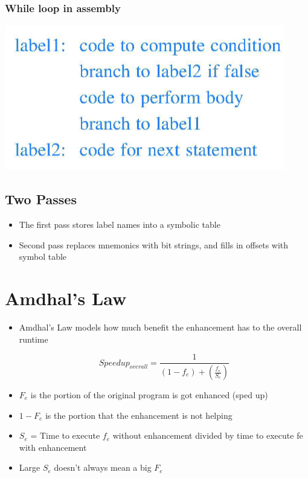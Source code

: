 \documentclass{article}
\begin{document}
\begin{itemize}
    
    \subsubsection{While loop in assembly}
    
    \includegraphics[scale=0.4]{images/while.png}
   
\end{itemize}

\subsection{Two Passes}
\begin{itemize}
    \item The first pass stores label names into a symbolic table
    \item Second pass replaces mnemonics with bit strings, and fills in offsets with symbol table
\end{itemize}


\section{Amdhal's Law}

\begin{itemize}
    \item Amdhal's Law models how much benefit the enhancement has to the overall runtime
    
    \begin{equation}
        Speedup_{overall}=\frac{1}{(1-f_e) + (\frac{f_e}{S_e})}
    \end{equation}
    
    \item $F_e$ is the portion of the original program is got enhanced (sped up) 
    
    \item $1 - F_e$ is the portion that the enhancement is not helping
    
    \item $S_e$ = Time to execute $f_e$ without enhancement divided by time to execute fe with enhancement
    
    \item Large $S_e$ doesn't always mean a big $F_e$
    \end{itemize}
\end{document}
